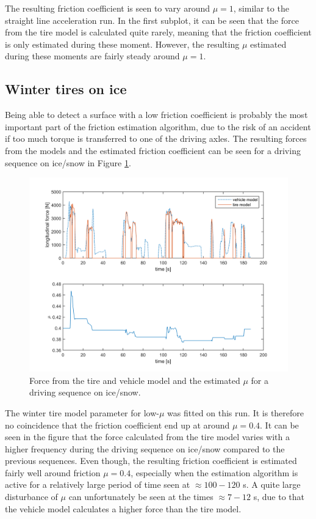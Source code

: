 The resulting friction coefficient is seen to vary around $ \mu = 1 $, similar to the straight line acceleration run. In the first subplot, it can be seen that the force from the tire model is calculated quite rarely, meaning that the friction coefficient is only estimated during these moment. However, the resulting $ \mu $ estimated during these moments are fairly steady around $ \mu = 1 $. 

\subsection{Winter tires on ice}
Being able to detect a surface with a low friction coefficient is probably the most important part of the friction estimation algorithm, due to the risk of an accident if too much torque is transferred to one of the driving axles. The resulting forces from the models and the estimated friction coefficient can be seen for a driving sequence on ice/snow in Figure \ref{force_mue_ice_normal}.

\begin{figure}[h]
	\centering
	\includegraphics[width=1.0\textwidth]{Pictures/force_mue_ice_normal}
	\caption {Force from the tire and vehicle model and the estimated $ \mu $ for a driving sequence on ice/snow.}
	\label{force_mue_ice_normal}
\end{figure}

The winter tire model parameter for low-$ \mu $ was fitted on this run. It is therefore no coincidence that the friction coefficient end up at around $ \mu = 0.4 $. It can be seen in the figure that the force calculated from the tire model varies with a higher frequency during the driving sequence on ice/snow compared to the previous sequences. Even though, the resulting friction coefficient is estimated fairly well around friction $ \mu = 0.4 $, especially when the estimation algorithm is active for a relatively large period of time seen at $ \approx 100-120 $ s. A quite large disturbance of $ \mu $ can unfortunately be seen at the times $ \approx 7 - 12$ s, due to that the vehicle model calculates a higher force than the tire model.  

